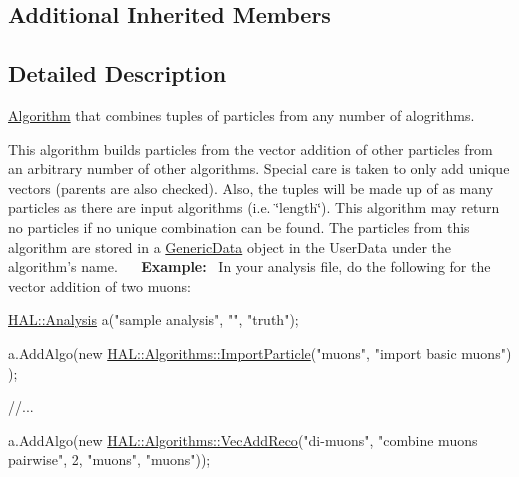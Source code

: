 \subsection*{Additional Inherited Members}


\subsection{Detailed Description}
\hyperlink{class_h_a_l_1_1_algorithm}{Algorithm} that combines tuples of particles from any number of alogrithms. 

This algorithm builds particles from the vector addition of other particles from an arbitrary number of other algorithms. Special care is taken to only add unique vectors (parents are also checked). Also, the tuples will be made up of as many particles as there are input algorithms (i.\+e. \char`\"{}length\char`\"{}). This algorithm may return no particles if no unique combination can be found. The particles from this algorithm are stored in a \hyperlink{class_h_a_l_1_1_generic_data}{Generic\+Data} object in the User\+Data under the algorithm's name.~\newline
~\newline
{\bfseries Example\+:}~\newline
In your analysis file, do the following for the vector addition of two muons\+:


\begin{DoxyCode}
\hyperlink{class_h_a_l_1_1_analysis}{HAL::Analysis} a(\textcolor{stringliteral}{"sample analysis"}, \textcolor{stringliteral}{""}, \textcolor{stringliteral}{"truth"});

a.AddAlgo(\textcolor{keyword}{new} \hyperlink{class_h_a_l_1_1_algorithms_1_1_import_particle}{HAL::Algorithms::ImportParticle}(\textcolor{stringliteral}{"muons"}, \textcolor{stringliteral}{"import basic muons"})
      );

\textcolor{comment}{//...}

a.AddAlgo(\textcolor{keyword}{new} \hyperlink{class_h_a_l_1_1_algorithms_1_1_vec_add_reco}{HAL::Algorithms::VecAddReco}(\textcolor{stringliteral}{"di-muons"}, \textcolor{stringliteral}{"combine muons pairwise"}, 
                                          2,
                                          \textcolor{stringliteral}{"muons"}, \textcolor{stringliteral}{"muons"}));
\end{DoxyCode}
 

